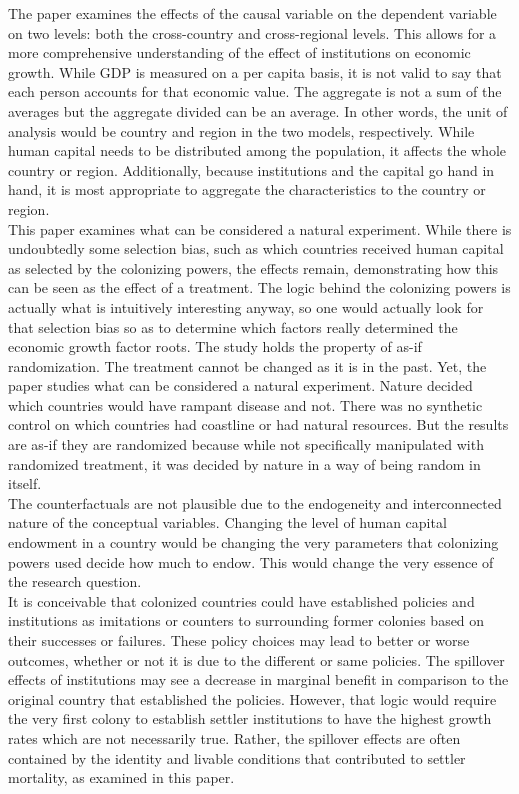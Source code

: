 \documentclass[12pt]{article}
\begin{document}
{The paper examines the effects of the causal variable on the dependent variable on two levels: both the cross-country and cross-regional levels. This allows for a more comprehensive understanding of the effect of institutions on economic growth. While GDP is measured on a per capita basis, it is not valid to say that each person accounts for that economic value. The aggregate is not a sum of the averages but the aggregate divided can be an average. In other words, the unit of analysis would be country and region in the two models, respectively. While human capital needs to be distributed among the population, it affects the whole country or region. Additionally, because institutions and the capital go hand in hand, it is most appropriate to aggregate the characteristics to the country or region.\\

This paper examines what can be considered a natural experiment. While there is undoubtedly some selection bias, such as which countries received human capital as selected by the colonizing powers, the effects remain, demonstrating how this can be seen as the effect of a treatment. The logic behind the colonizing powers is actually what is intuitively interesting anyway, so one would actually look for that selection bias so as to determine which factors really determined the economic growth factor roots. The study holds the property of as-if randomization. The treatment cannot be changed as it is in the past. Yet, the paper studies what can be considered a natural experiment. Nature decided which countries would have rampant disease and not. There was no synthetic control on which countries had coastline or had natural resources. But the results are as-if they are randomized because while not specifically manipulated with randomized treatment, it was decided by nature in a way of being random in itself.\\

The counterfactuals are not plausible due to the endogeneity and interconnected nature of the conceptual variables. Changing the level of human capital endowment in a country would be changing the very parameters that colonizing powers used decide how much to endow. This would change the very essence of the research question. \\

It is conceivable that colonized countries could have established policies and institutions as imitations or counters to surrounding former colonies based on their successes or failures. These policy choices may lead to better or worse outcomes, whether or not it is due to the different or same policies. The spillover effects of institutions may see a decrease in marginal benefit in comparison to the original country that established the policies. However, that logic would require the very first colony to establish settler institutions to have the highest growth rates which are not necessarily true. Rather, the spillover effects are often contained by the identity and livable conditions that contributed to settler mortality, as examined in this paper. \\

}
\end{document}

